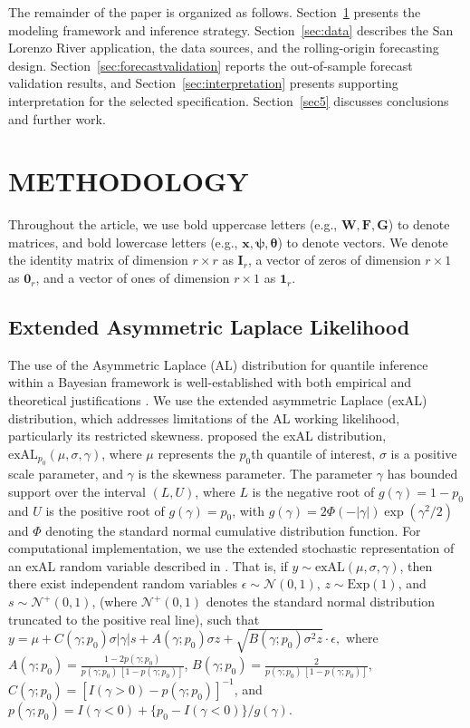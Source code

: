 \documentclass[APA,STIX1COL]{WileyNJD-v2}
\begin{document}
The remainder of the paper is organized as follows. Section~\ref{sec:methodology} presents the modeling framework and inference strategy. Section~\ref{sec:data} describes the San Lorenzo River application, the data sources, and the rolling-origin forecasting design. Section~\ref{sec:forecastvalidation} reports the out-of-sample forecast validation results, and Section~\ref{sec:interpretation} presents supporting interpretation for the selected specification. Section~\ref{sec5} discusses conclusions and further work.

\section{METHODOLOGY}
\label{sec:methodology}

Throughout the article, we use bold uppercase letters (e.g., $\mathbf{W}, \mathbf{F}, \mathbf{G}$) to denote matrices, and bold lowercase letters (e.g., $\mathbf{x}, \boldsymbol{\psi}, \boldsymbol{\theta}$) to denote vectors. We denote the identity matrix of dimension $r \times r$ as $\mathbf{I}_r$, a vector of zeros of dimension $r \times 1$ as $\mathbf{0}_r$, and a vector of ones of dimension $r \times 1$ as $\mathbf{1}_r$.

\subsection{Extended Asymmetric Laplace Likelihood}
\label{subsec:exal}

The use of the Asymmetric Laplace (AL) distribution for quantile inference within a Bayesian framework is well-established with both empirical and theoretical justifications \citep{yu2001bayesian, sriram2013theoretical}. We use the extended asymmetric Laplace (exAL) distribution, which addresses limitations of the AL working likelihood, particularly its restricted skewness. \citet{yan2025new} proposed the exAL distribution, $\text{exAL}_{p_0}(\mu, \sigma, \gamma)$, where $\mu$ represents the $p_0$th quantile of interest, $\sigma$ is a positive scale parameter, and $\gamma$ is the skewness parameter. The parameter $\gamma$ has bounded support over the interval $(L, U)$, where $L$ is the negative root of $g(\gamma) = 1 - p_0$ and $U$ is the positive root of $g(\gamma) = p_0$, with $g(\gamma) = 2 \Phi(-|\gamma|) \exp(\gamma^2 / 2)$ and $\Phi$ denoting the standard normal cumulative distribution function. For computational implementation, we use the extended stochastic representation of an exAL random variable described in \citet{yan2025new}. That is, if $y \sim \text{exAL}(\mu, \sigma, \gamma)$, then there exist independent random variables $\epsilon \sim \mathcal{N}(0, 1)$, $z \sim \text{Exp}(1)$, and $s \sim \mathcal{N}^+(0, 1)$, (where $\mathcal{N}^+(0, 1)$ denotes the standard normal distribution truncated to the positive real line), such that  \( y = \mu + C(\gamma; p_0)\sigma |\gamma| s + A(\gamma; p_0) \sigma z + \sqrt{B(\gamma; p_0) \sigma^2 z} \cdot \epsilon, \) where $A(\gamma; p_0) = \frac{1 - 2 p(\gamma; p_0)}{p(\gamma; p_0) \, [1 - p(\gamma; p_0)]}$, $B(\gamma; p_0) = \frac{2}{p(\gamma; p_0) \, [1 - p(\gamma; p_0)]}$, $C(\gamma; p_0) = [I(\gamma > 0) - p(\gamma; p_0)]^{-1}$, and $p(\gamma; p_0) = I(\gamma < 0) + \{p_0 - I(\gamma < 0)\} / g(\gamma)$.
\end{document}
